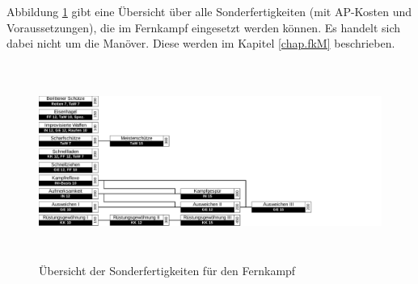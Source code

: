 Abbildung \ref{fig.fSF} gibt eine Übersicht über alle Sonderfertigkeiten (mit AP-Kosten und Voraussetzungen), die im Fernkampf eingesetzt werden können.
Es handelt sich dabei nicht um die Manöver. Diese werden im Kapitel \ref{chap.fkM} beschrieben.

\begin{figure}
    \centering
    \includegraphics[width=16.93cm,height=6.454cm]{fig/fkSF.pdf}
    \caption{Übersicht der Sonderfertigkeiten für den Fernkampf}
    \label{fig.fSF}
\end{figure}




















































